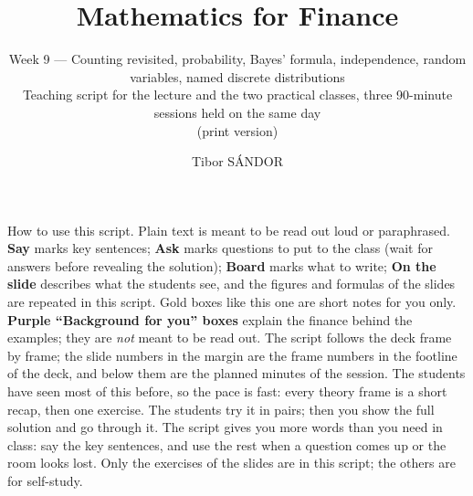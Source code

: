 \documentclass[11pt,a4paper,parskip=half]{scrartcl}
\title{Mathematics for Finance}
\subtitle{Week 9 --- Counting revisited, probability, Bayes' formula,
  independence, random variables, named discrete distributions\\[2pt]
  \normalsize Teaching script for the lecture and the two practical classes,
  three 90-minute sessions held on the same day\ifdefined\scriptprint\\[2pt]
  (print version)\fi}
\author{Tibor SÁNDOR\\[2pt]
  \normalsize\href{mailto:\myemail}{\texttt{\myemail}}}
\begin{document}
\maketitle

\begin{printskip}
	\begin{cue}
		How to use this script. Plain text is meant to be read out loud or
		paraphrased. \textbf{Say} marks key sentences; \textbf{Ask} marks
		questions to put to the class (wait for answers before revealing the
		solution); \textbf{Board} marks what to write; \textbf{On the slide}
		describes what the students see, and the figures and formulas of the
		slides are repeated in this script. Gold boxes like this one are short
		notes for you only. \textbf{Purple ``Background for you'' boxes}
		explain the finance behind the examples; they are \emph{not} meant to
		be read out. The script follows the deck frame by frame; the slide
		numbers in the margin are the frame numbers in the footline of the
		deck, and below them are the planned minutes of the session. The students have seen most of this before, so the pace is fast:
		every theory frame is a short recap, then one exercise. The students
		try it in pairs; then you show the full solution and go through it. The
		script gives you more words than you need in class: say the key
		sentences, and use the rest when a question comes up or the room looks
		lost. Only the exercises of the slides are in this script; the others
		are for self-study.
	\end{cue}
\end{printskip}
\end{document}
